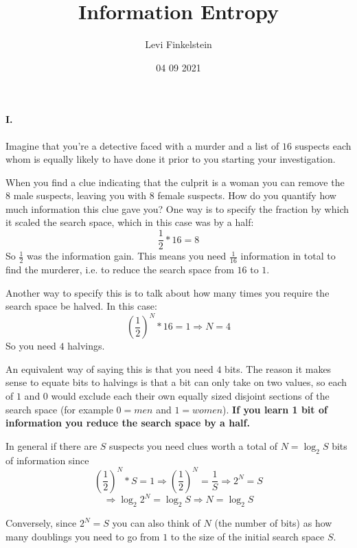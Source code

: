 \title{Information Entropy}
\author{Levi Finkelstein}
\date{04 09 2021}


\maketitle

\paragraph{I.}
Imagine that you're a detective faced with a murder and a list of $16$ suspects each whom is equally likely to have done it prior to you starting your investigation. 
\par
When you find a clue indicating that the culprit is a woman you can remove the $8$ male suspects, leaving you with $8$ female suspects. How do you quantify how much information this clue gave you? One way is to specify the fraction by which it scaled the search space, which in this case was by a half:
$$\frac{1}{2}*16 = 8$$
So $\frac{1}{2}$ was the information gain. This means you need $\frac{1}{16}$ information in total to find the murderer, i.e. to reduce the search space from $16$ to $1$.
\par
Another way to specify this is to talk about how many times you require the search space be halved. In this case:
$$(\frac{1}{2})^N*16 = 1 \Rightarrow N=4$$ 
So you need $4$ halvings. 
\par
An equivalent way of saying this is that you need $4$ bits. The reason it makes sense to equate bits to halvings is that a bit can only take on two values, so each of $1$ and $0$ would exclude each their own equally sized disjoint sections of the search space (for example $0=men$ and $1=women$). \textbf{If you learn 1 bit of information you reduce the search space by a half.}
\par
In general if there are $S$ suspects you need clues worth a total of $N=\log_2{S}$ bits of information since 
$$(\frac{1}{2})^N*S=1 \Rightarrow (\frac{1}{2})^N=\frac{1}{S}\Rightarrow 2^N=S$$
$$\Rightarrow \log_2{2^N}=\log_2{S} \Rightarrow N = \log_2{S}$$

Conversely, since $2^N = S$ you can also think of $N$ (the number of bits) as how many doublings you need to go from $1$ to the size of the initial search space $S$.
